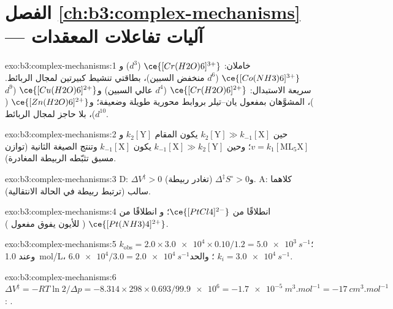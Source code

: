 \section*{الفصل \ref{ch:b3:complex-mechanisms} --- آليات تفاعلات المعقدات}

\begin{solution}{exo:b3:complex-mechanisms:1}
خاملان: $\ce{[Cr(H2O)6]^{3+}}$ ($d^3$) و$\ce{[Co(NH3)6]^{3+}}$ ($d^6$ منخفض السبين)، بطاقتي تنشيط
كبيرتين لمجال الربائط. سريعة الاستبدال: $\ce{[Cr(H2O)6]^{2+}}$ ($d^4$ عالي السبين) و$\ce{[Cu(H2O)6]^{2+}}$ ($d^9$)،
المشوَّهان بمفعول يان--تيلر بروابط محورية طويلة وضعيفة؛ و$\ce{[Zn(H2O)6]^{2+}}$ ($d^{10}$)، بلا حاجز
لمجال الربائط.
\end{solution}

\begin{solution}{exo:b3:complex-mechanisms:2}
حين $k_2[\mathrm Y] \gg k_{-1}[\mathrm X]$ يكون المقام $k_2[\mathrm Y]$ و$v = k_1[\mathrm{ML_5X}]$؛ وحين $k_{-1}[\mathrm X] \gg k_2[\mathrm Y]$ يكون
$k_{-1}[\mathrm X]$ وتنتج الصيغة الثانية (توازن مسبق تثبّطه الربيطة
المغادرة).
\end{solution}

\begin{solution}{exo:b3:complex-mechanisms:3}
D: $\Delta V^{\ddagger} > 0$ و$\Delta^{\ddagger}S^\circ > 0$ (تغادر ربيطة). A: كلاهما سالب (ترتبط ربيطة في
الحالة الانتقالية).
\end{solution}

\begin{solution}{exo:b3:complex-mechanisms:4}
 انطلاقًا من $\ce{[PtCl4]^{2-}}$؛ و انطلاقًا من $\ce{[Pt(NH3)4]^{2+}}$ ( للأيون  يفوق مفعول ).
\end{solution}

\begin{solution}{exo:b3:complex-mechanisms:5}
$k_{\mathrm{obs}} = 2.0 \times \num{3.0e4} \times 0.10/1.2 = \qty{5.0e3}{s^{-1}}$؛ وعند \qty{1.0}{mol/L}، $\num{6.0e4}/3.0 = \qty{2.0e4}{s^{-1}}$؛ والحد
$k_i = \qty{3.0e4}{s^{-1}}$.
\end{solution}

\begin{solution}{exo:b3:complex-mechanisms:6}
$\Delta V^{\ddagger} = -RT\ln2/\Delta p = -8.314 \times 298 \times 0.693/\num{99.9e6} = \qty{-1.7e-5}{m^3.mol^{-1}} = \qty{-17}{cm^3.mol^{-1}}$:
.
\end{solution}

